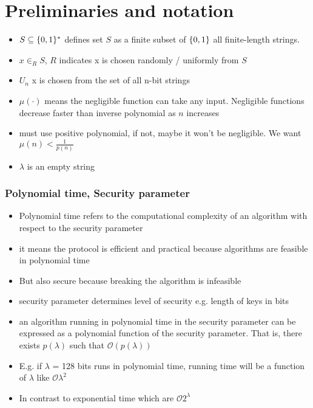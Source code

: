 \section*{Preliminaries and notation}
\begin{itemize}
    \item $S \subseteq \{0,1\}^*$ defines set $S$ as a finite subset of $\{0,1\}$ all finite-length strings. 
    \item $x \in_R S$, $R$ indicates x is chosen randomly / uniformly from $S$
    \item $U_n$ x is chosen from the set of all n-bit strings
    \item $\mu(\cdot)$ means the negligible function can take any input. Negligible functions decrease faster than inverse polynomial as $n$ increases
    \item must use positive polynomial, if not, maybe it won't be negligible. We want $\mu(n) < \frac{1}{p(n)}$
    \item $\lambda$ is an empty string
\end{itemize}

\subsubsection*{Polynomial time, Security parameter}
\begin{itemize}
    \item Polynomial time refers to the computational complexity of an algorithm with respect to the security parameter
    \item it means the protocol is efficient and practical because algorithms are feasible in polynomial time
    \item But also secure because breaking the algorithm is infeasible
    \item security parameter determines level of security e.g. length of keys in bits
    \item an algorithm running in polynomial time in the security parameter can be expressed as a polynomial function of the security parameter. That is, there exists $ p(\lambda)$ such that $\mathcal{O}(p(\lambda))$
    \item E.g. if $\lambda$ = 128 bits runs in polynomial time, running time will be a function of $\lambda$ like $\mathcal{O}\lambda^2$
    \item In contrast to exponential time which are $\mathcal{O}2^{\lambda}$
\end{itemize}


